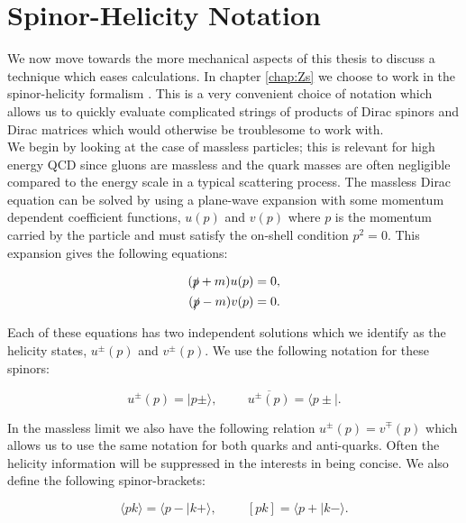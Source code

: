 \section{Spinor-Helicity Notation}
	\label{sec:SpinorHelicity}

	We now move towards the more mechanical aspects of this thesis to discuss a technique which eases calculations.
	In chapter \ref{chap:Zs} we choose to work in the spinor-helicity formalism \cite{Dixon:1996wi,CBO9781107706620A004}.
	This is a very convenient choice of notation which allows us to quickly evaluate complicated strings of products of
	Dirac spinors and Dirac matrices which would otherwise be troublesome to work with.\\We begin by looking at the case
	of massless particles; this is relevant for high energy QCD since gluons are massless and the quark masses are often
	negligible compared to the energy scale in a typical scattering process.  The massless Dirac equation can be solved
	by using a plane-wave expansion with some momentum dependent coefficient functions, $u(p)$ and $v(p)$ where $p$ is the
	momentum carried by the particle and must satisfy the on-shell condition $p^2=0$.  This expansion gives the following
	equations:

	\begin{align}
	\begin{split}
		(\slashed p + m)u(p) = 0, \\
		(\slashed p - m)v(p) = 0.
	\end{split}
	\end{align}

	Each of these equations has two independent solutions which we identify as the helicity states, $u^\pm(p)$ and $v^\pm(p)$.
	We use the following notation for these spinors:

	\begin{equation}
		u^\pm(p) = \mid p\pm\rangle, \hspace{1cm} \overline{u^\pm(p)} = \langle p\pm\mid.
	\end{equation}

	In the massless limit we also have the following relation $u^\pm(p) = v^\mp(p)$ which allows us to use the same notation for both
	quarks and anti-quarks.  Often the helicity information will be suppressed in the interests in being concise.  We also define the
	following spinor-brackets:

	\begin{equation}
		\langle pk\rangle = \langle p-\mid k+\rangle, \hspace{1cm} [pk] = \langle p+\mid k-\rangle.
	\end{equation}

